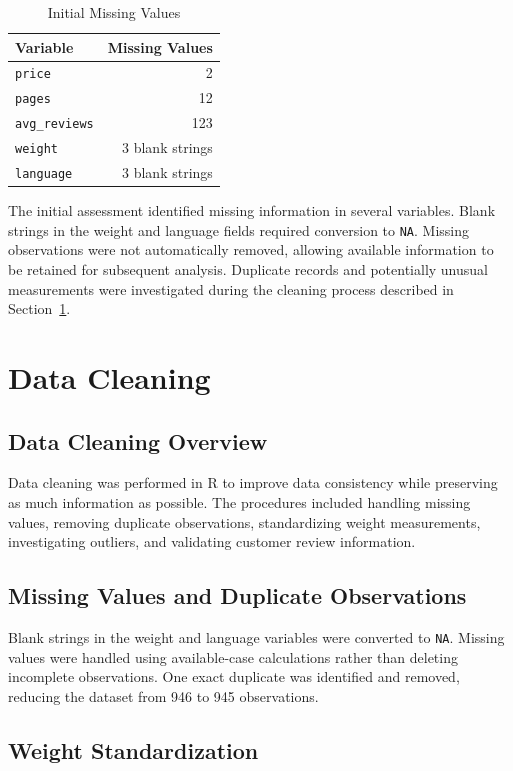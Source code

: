 \documentclass[11pt,a4paper]{article}
\begin{document}
\begin{table}[H]
\centering
\begin{tabular}{lr}
\toprule
Variable & Missing Values \\
\midrule
\texttt{price} & 2 \\
\texttt{pages} & 12 \\
\texttt{avg\_reviews} & 123 \\
\texttt{weight} & 3 blank strings \\
\texttt{language} & 3 blank strings \\
\bottomrule
\end{tabular}
\caption{Initial Missing Values}
\label{tab:missing}
\end{table}
The initial assessment identified missing information
in several variables. Blank strings in the weight and
language fields required conversion to \texttt{NA}.
Missing observations were not automatically removed,
allowing available information to be retained for
subsequent analysis. Duplicate records and potentially
unusual measurements were investigated during the
cleaning process described in Section~\ref{sec:cleaning}.
\section{Data Cleaning}
\label{sec:cleaning}
\subsection{Data Cleaning Overview}

Data cleaning was performed in R to improve data consistency
while preserving as much information as possible. The procedures
included handling missing values, removing duplicate observations,
standardizing weight measurements, investigating outliers,
and validating customer review information.

\subsection{Missing Values and Duplicate Observations}

Blank strings in the weight and language variables were converted
to \texttt{NA}. Missing values were handled using available-case
calculations rather than deleting incomplete observations.
One exact duplicate was identified and removed, reducing the
dataset from 946 to 945 observations.

\subsection{Weight Standardization}
\end{document}
